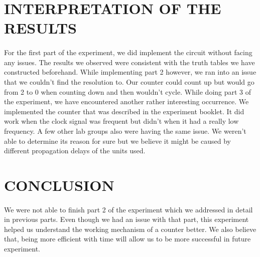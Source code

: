 \documentclass[pdftex,12pt,a4paper]{article}
\begin{document}
\section{INTERPRETATION OF THE RESULTS}
\begin{flushleft}



\paragraph {}
For the first part of the experiment, we did implement the circuit without facing any issues. The results we observed were consistent with the truth tables we have constructed beforehand. While implementing part 2 however, we ran into an issue that we couldn't find the resolution to. Our counter could count up but would go from 2 to 0 when counting down and then wouldn't cycle. While doing part 3 of the experiment, we have encountered another rather interesting occurrence. We implemented the counter that was described in the experiment booklet. It did work when the clock signal was frequent but didn't when it had a really low frequency. A few other lab groups also were having the same issue. We weren't able to determine its reason for sure but we believe it might be caused by different propagation delays of the units used.


\end{flushleft}

\section{CONCLUSION}

\begin{flushleft}

 \paragraph {}
 We were not able to finish part 2 of the experiment which we addressed in detail in previous parts. Even though we had an issue with that part, this experiment helped us understand the working mechanism of a counter better. 
 \newline We also believe that, being more efficient with time will allow us to be more successful in future experiment.
\end{flushleft}


\nocite{overleaf}
\nocite{reportGuide}

 

\newpage
{}



\end{document}
